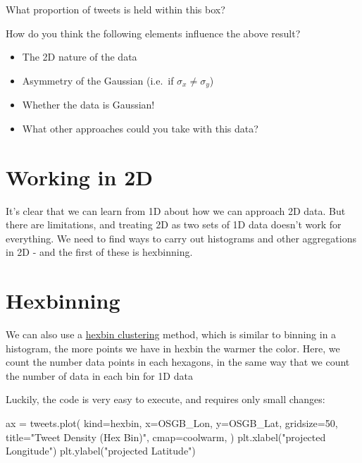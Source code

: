 \documentclass[
  letterpaper,
  DIV=11,
  numbers=noendperiod]{scrreprt}
\newenvironment{Shaded}{\begin{snugshade}}{\end{snugshade}}
\newcommand{\DecValTok}[1]{\textcolor[rgb]{0.68,0.00,0.00}{#1}}
\newcommand{\NormalTok}[1]{\textcolor[rgb]{0.00,0.23,0.31}{#1}}
\newcommand{\OperatorTok}[1]{\textcolor[rgb]{0.37,0.37,0.37}{#1}}
\newcommand{\StringTok}[1]{\textcolor[rgb]{0.13,0.47,0.30}{#1}}
\begin{document}
What proportion of tweets is held within this box?

How do you think the following elements influence the above result?

\begin{itemize}
\item
  The 2D nature of the data
\item
  Asymmetry of the Gaussian (i.e.~if \(\sigma_x \neq \sigma_y\))
\item
  Whether the data is Gaussian!
\item
  What other approaches could you take with this data?
\end{itemize}

\hypertarget{working-in-2d}{%
\section{Working in 2D}\label{working-in-2d}}

It's clear that we can learn from 1D about how we can approach 2D data.
But there are limitations, and treating 2D as two sets of 1D data
doesn't work for everything. We need to find ways to carry out
histograms and other aggregations in 2D - and the first of these is
hexbinning.

\hypertarget{hexbinning}{%
\section{Hexbinning}\label{hexbinning}}

We can also use a
\href{http://pandas-docs.github.io/pandas-docs-travis/visualization.html\#hexagonal-bin-plot}{hexbin
clustering} method, which is similar to binning in a histogram, the more
points we have in hexbin the warmer the color. Here, we count the number
data points in each hexagons, in the same way that we count the number
of data in each bin for 1D data

Luckily, the code is very easy to execute, and requires only small
changes:

\begin{Shaded}
\begin{Highlighting}[]
\NormalTok{ax }\OperatorTok{=}\NormalTok{ tweets.plot(}
\NormalTok{    kind}\OperatorTok{=}\StringTok{\textquotesingle{}hexbin\textquotesingle{}}\NormalTok{,}
\NormalTok{    x}\OperatorTok{=}\StringTok{\textquotesingle{}OSGB\_Lon\textquotesingle{}}\NormalTok{, y}\OperatorTok{=}\StringTok{\textquotesingle{}OSGB\_Lat\textquotesingle{}}\NormalTok{,}
\NormalTok{    gridsize}\OperatorTok{=}\DecValTok{50}\NormalTok{,}
\NormalTok{    title}\OperatorTok{=}\StringTok{"Tweet Density (Hex Bin)"}\NormalTok{,}
\NormalTok{    cmap}\OperatorTok{=}\StringTok{\textquotesingle{}coolwarm\textquotesingle{}}\NormalTok{,}
\NormalTok{    )}
\NormalTok{plt.xlabel(}\StringTok{"projected Longitude"}\NormalTok{)}
\NormalTok{plt.ylabel(}\StringTok{"projected Latitude"}\NormalTok{)}
\end{Highlighting}
\end{Shaded}
\end{document}

